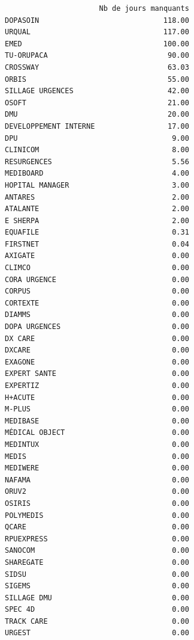 \documentclass[]{article}
\begin{document}
\begin{verbatim}
                      Nb de jours manquants
DOPASOIN                             118.00
URQUAL                               117.00
EMED                                 100.00
TU-ORUPACA                            90.00
CROSSWAY                              63.03
ORBIS                                 55.00
SILLAGE URGENCES                      42.00
OSOFT                                 21.00
DMU                                   20.00
DEVELOPPEMENT INTERNE                 17.00
DPU                                    9.00
CLINICOM                               8.00
RESURGENCES                            5.56
MEDIBOARD                              4.00
HOPITAL MANAGER                        3.00
ANTARES                                2.00
ATALANTE                               2.00
E SHERPA                               2.00
EQUAFILE                               0.31
FIRSTNET                               0.04
AXIGATE                                0.00
CLIMCO                                 0.00
CORA URGENCE                           0.00
CORPUS                                 0.00
CORTEXTE                               0.00
DIAMMS                                 0.00
DOPA URGENCES                          0.00
DX CARE                                0.00
DXCARE                                 0.00
EXAGONE                                0.00
EXPERT SANTE                           0.00
EXPERTIZ                               0.00
H+ACUTE                                0.00
M-PLUS                                 0.00
MEDIBASE                               0.00
MÉDICAL OBJECT                         0.00
MEDINTUX                               0.00
MEDIS                                  0.00
MEDIWERE                               0.00
NAFAMA                                 0.00
ORUV2                                  0.00
OSIRIS                                 0.00
POLYMEDIS                              0.00
QCARE                                  0.00
RPUEXPRESS                             0.00
SANOCOM                                0.00
SHAREGATE                              0.00
SIDSU                                  0.00
SIGEMS                                 0.00
SILLAGE DMU                            0.00
SPEC 4D                                0.00
TRACK CARE                             0.00
URGEST                                 0.00
\end{verbatim}
\end{document}

